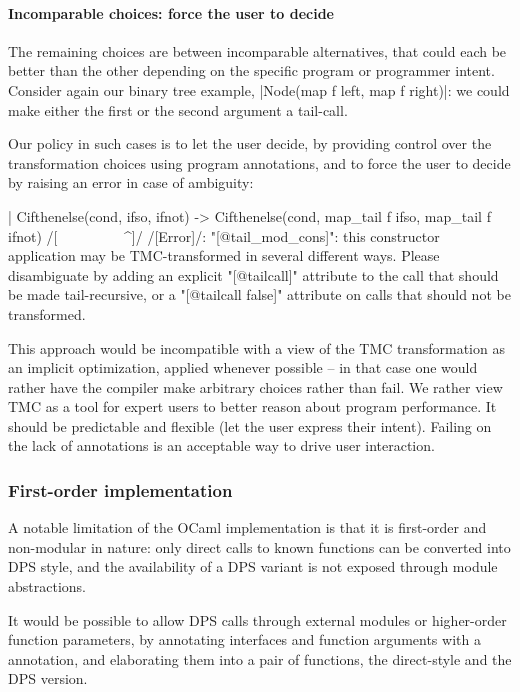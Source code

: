 \paragraph{Incomparable choices: force the user to decide} The
remaining choices are between incomparable alternatives, that could
each be better than the other depending on the specific program or
programmer intent. Consider again our binary tree example,
\ocaml|Node(map f left, map f right)|: we could make either the first
or the second argument a tail-call.

Our policy in such cases is to let the user decide, by providing
control over the transformation choices using \ocaml{[@tailcall]}
program annotations, and to force the user to decide by raising an
error in case of ambiguity:
\begin{Ocaml}
  | Cifthenelse(cond, ifso, ifnot) ->
      Cifthenelse(cond, map_tail f ifso, map_tail f ifnot)
      /[^^^^^^^^^^^^^^^^^^^^^^^^^^^^^^^^^^^^^^^^^^^^^^^^^^^^]/
/[Error]/: "[@tail_mod_cons]": this constructor application may be TMC-transformed
       in several different ways. Please disambiguate by adding an explicit
       "[@tailcall]" attribute to the call that should be made tail-recursive,
       or a "[@tailcall false]" attribute on calls that should not be
       transformed.
\end{Ocaml}

This approach would be incompatible with a view of the TMC
transformation as an implicit optimization, applied whenever
possible -- in that case one would rather have the compiler make
arbitrary choices rather than fail. We rather view TMC as a tool for
expert users to better reason about program performance. It should be
predictable and flexible (let the user express
their intent). Failing on the lack of annotations is an acceptable way
to drive user interaction.

\subsubsection{First-order implementation} A notable limitation of the
OCaml implementation is that it is first-order and non-modular in
nature: only direct calls to known functions can be converted into DPS
style, and the availability of a DPS variant is not exposed through
module abstractions.

It would be possible to allow DPS calls through external modules or
higher-order function parameters, by annotating interfaces and
function arguments with a  annotation, and
elaborating them into a pair of functions, the direct-style and the DPS
version.

